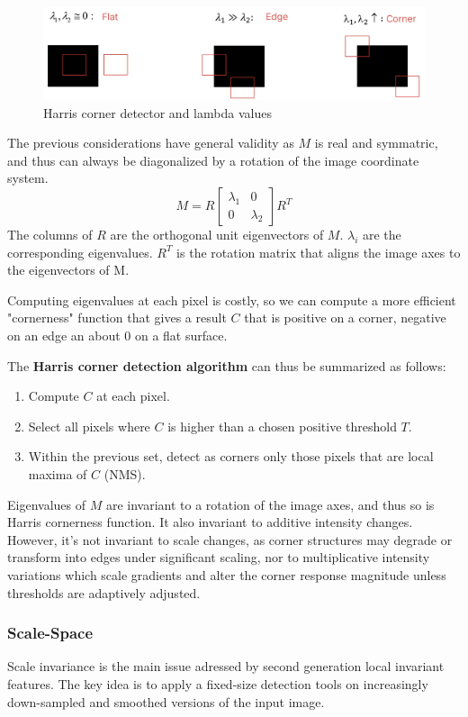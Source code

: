 \begin{figure}[htbp]
  \centering
  \includegraphics[width=0.9\linewidth]{./img/harris_corner_detector.jpg}
  \caption{Harris corner detector and lambda values}
  \label{fig:harris_corner_detector}
\end{figure}

The previous considerations have general validity as $M$ is real and symmatric, and thus can always be diagonalized by a rotation of the image coordinate system.
$$M = R\begin{bmatrix} \lambda_1 & 0 \\ 0 & \lambda_2 \end{bmatrix}R^T$$
The columns of $R$ are the orthogonal unit eigenvectors of $M$.
$\lambda_i$ are the corresponding eigenvalues.
$R^T$ is the rotation matrix that aligns the image axes to the eigenvectors of M.

Computing eigenvalues at each pixel is costly, so we can compute a more efficient "cornerness" function that gives a result $C$ that is positive on a corner, negative on an edge an about 0 on a flat surface.

The \textbf{Harris corner detection algorithm} can thus be summarized as follows:
\begin{enumerate}
  \item Compute $C$ at each pixel.
  \item Select all pixels where $C$ is higher than a chosen positive threshold $T$.
  \item Within the previous set, detect as corners only those pixels that are local maxima of $C$ (NMS).
\end{enumerate}

Eigenvalues of $M$ are invariant to a rotation of the image axes, and thus so is Harris cornerness function.
It also invariant to additive intensity changes.
However, it's not invariant to scale changes, as corner structures may degrade or transform into edges under significant scaling, nor to multiplicative intensity variations which scale gradients and alter the corner response magnitude unless thresholds are adaptively adjusted.

\subsubsection{Scale-Space}
Scale invariance is the main issue adressed by second generation local invariant features.
The key idea is to apply a fixed-size detection tools on increasingly down-sampled and smoothed versions of the input image.

